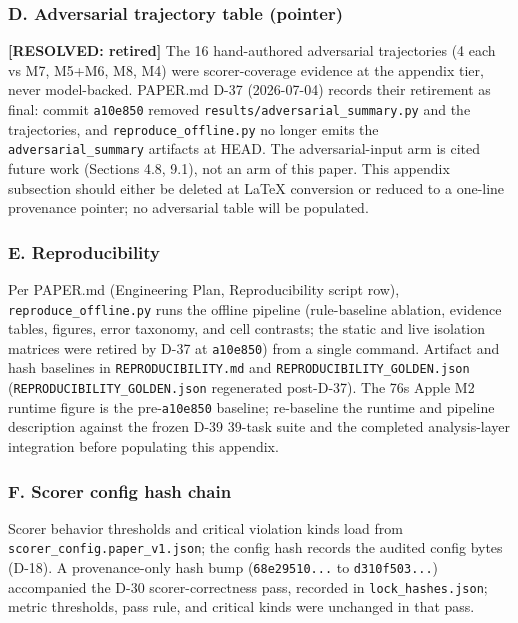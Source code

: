 \documentclass[
]{article}
\begin{document}
\subsubsection{D. Adversarial trajectory table
(pointer)}\label{d.-adversarial-trajectory-table-pointer}

\textbf{{[}RESOLVED: retired{]}} The 16 hand-authored adversarial
trajectories (4 each vs M7, M5+M6, M8, M4) were scorer-coverage evidence
at the appendix tier, never model-backed. PAPER.md D-37 (2026-07-04)
records their retirement as final: commit \texttt{a10e850} removed
\texttt{results/adversarial\_summary.py} and the trajectories, and
\texttt{reproduce\_offline.py} no longer emits the
\texttt{adversarial\_summary} artifacts at HEAD. The adversarial-input
arm is cited future work (Sections 4.8, 9.1), not an arm of this paper.
This appendix subsection should either be deleted at LaTeX conversion or
reduced to a one-line provenance pointer; no adversarial table will be
populated.

\subsubsection{E. Reproducibility}\label{e.-reproducibility}

Per PAPER.md (Engineering Plan, Reproducibility script row),
\texttt{reproduce\_offline.py} runs the offline pipeline (rule-baseline
ablation, evidence tables, figures, error taxonomy, and cell contrasts;
the static and live isolation matrices were retired by D-37 at
\texttt{a10e850}) from a single command. Artifact and hash baselines in
\texttt{REPRODUCIBILITY.md} and \texttt{REPRODUCIBILITY\_GOLDEN.json}
(\texttt{REPRODUCIBILITY\_GOLDEN.json} regenerated post-D-37). The 76s
Apple M2 runtime figure is the pre-\texttt{a10e850} baseline;
re-baseline the runtime and pipeline description against the frozen D-39
39-task suite and the completed analysis-layer integration before
populating this appendix.

\subsubsection{F. Scorer config hash
chain}\label{f.-scorer-config-hash-chain}

Scorer behavior thresholds and critical violation kinds load from
\texttt{scorer\_config.paper\_v1.json}; the config hash records the
audited config bytes (D-18). A provenance-only hash bump
(\texttt{68e29510...} to \texttt{d310f503...}) accompanied the D-30
scorer-correctness pass, recorded in \texttt{lock\_hashes.json}; metric
thresholds, pass rule, and critical kinds were unchanged in that pass.
\end{document}
